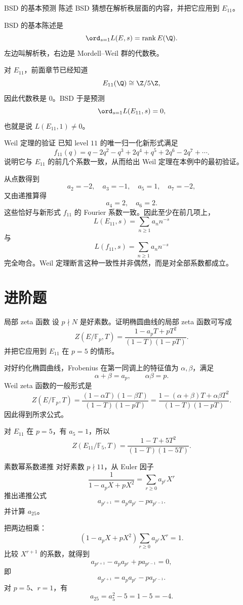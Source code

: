\begin{problem}{BSD 的基本预测}
\easy
陈述 BSD 猜想在解析秩层面的内容，并把它应用到 $E_{11}$。
\end{problem}
\begin{solution}
BSD 的基本陈述是
\[
\ord_{s=1}L(E,s)=\operatorname{rank}E(\Q).
\]
左边叫解析秩，右边是 Mordell--Weil 群的代数秩。

对 $E_{11}$，前面章节已经知道
\[
E_{11}(\Q)\cong \Z/5\Z,
\]
因此代数秩是 $0$。BSD 于是预测
\[
\ord_{s=1}L(E_{11},s)=0,
\]
也就是说 $L(E_{11},1)\ne 0$。
\end{solution}

\begin{problem}{Weil 定理的验证}
\easy
已知 level $11$ 的唯一归一化新形式满足
\[
f_{11}(q)=q-2q^2-q^3+2q^4+q^5+2q^6-2q^7+\cdots.
\]
说明它与 $E_{11}$ 的前几个系数一致，从而给出 Weil 定理在本例中的最初验证。
\end{problem}
\begin{solution}
从点数得到
\[
a_2=-2,\quad a_3=-1,\quad a_5=1,\quad a_7=-2,
\]
又由递推算得
\[
a_4=2,\quad a_6=2.
\]
这些恰好与新形式 $f_{11}$ 的 Fourier 系数一致。因此至少在前几项上，
\[
L(E_{11},s)=\sum_{n\ge1}a_nn^{-s}
\]
与
\[
L(f_{11},s)=\sum_{n\ge1}a_nn^{-s}
\]
完全吻合。Weil 定理断言这种一致性并非偶然，而是对全部系数都成立。
\end{solution}

\section{进阶题 \medium}

\begin{problem}{局部 zeta 函数}
\medium
设 $p\nmid N$ 是好素数。证明椭圆曲线的局部 zeta 函数可写成
\[
Z(E/\mathbb{F}_p,T)=\frac{1-a_pT+pT^2}{(1-T)(1-pT)}.
\]
并把它应用到 $E_{11}$ 在 $p=5$ 的情形。
\end{problem}
\begin{solution}
对好约化椭圆曲线，Frobenius 在第一同调上的特征值为 $\alpha,\beta$，满足
\[
\alpha+\beta=a_p,
\qquad
\alpha\beta=p.
\]
Weil zeta 函数的一般形式是
\[
Z(E/\mathbb{F}_p,T)=\frac{(1-\alpha T)(1-\beta T)}{(1-T)(1-pT)}
=\frac{1-(\alpha+\beta)T+\alpha\beta T^2}{(1-T)(1-pT)}.
\]
因此得到所求公式。

对 $E_{11}$ 在 $p=5$，有 $a_5=1$，所以
\[
Z(E_{11}/\mathbb{F}_5,T)=\frac{1-T+5T^2}{(1-T)(1-5T)}.
\]
\end{solution}

\begin{problem}{素数幂系数递推}
\medium
对好素数 $p\nmid 11$，从 Euler 因子
\[
\frac{1}{1-a_pX+pX^2}=\sum_{r\ge0}a_{p^r}X^r
\]
推出递推公式
\[
a_{p^{r+1}}=a_pa_{p^r}-pa_{p^{r-1}}.
\]
并计算 $a_{25}$。
\end{problem}
\begin{solution}
把两边相乘：
\[
(1-a_pX+pX^2)\sum_{r\ge0}a_{p^r}X^r=1.
\]
比较 $X^{r+1}$ 的系数，就得到
\[
a_{p^{r+1}}-a_pa_{p^r}+pa_{p^{r-1}}=0,
\]
即
\[
a_{p^{r+1}}=a_pa_{p^r}-pa_{p^{r-1}}.
\]
对 $p=5$、$r=1$，有
\[
a_{25}=a_5^2-5=1-5=-4.
\]
\end{solution}

